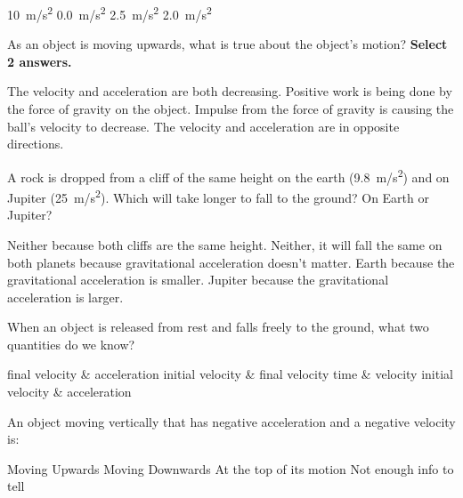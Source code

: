 \documentclass[answers,dvipsnames]{exam}
\begin{document}
\begin{questions}
\begin{randomizechoices}[norandomize]
    \choice \SI{10}{m/s^2}
    \choice \SI{0.0}{m/s^2}
    \correctchoice \SI{2.5}{m/s^2}
    \choice \SI{2.0}{m/s^2}
\end{randomizechoices}

\question
As an object is moving upwards, what is true about the object’s motion? \textbf{Select 2 answers.}


\begin{randomizechoices}[norandomize]
    \choice The velocity and acceleration are both decreasing.
    \choice Positive work is being done by the force of gravity on the object.
    \correctchoice Impulse from the force of gravity is causing the ball’s velocity to decrease.
    \correctchoice The velocity and acceleration are in opposite directions.
\end{randomizechoices}

\question
A rock is dropped from a cliff of the same height on the earth (\SI{9.8}{m/s^2}) and on Jupiter (\SI{25}{m/s^2}). Which will take longer to fall to the ground? On Earth or Jupiter?

\begin{randomizechoices}[norandomize]
    \choice Neither because both cliffs are the same height.
    \choice Neither, it will fall the same on both planets because gravitational acceleration doesn’t matter.
    \correctchoice Earth because the gravitational acceleration is smaller.
    \choice Jupiter because the gravitational acceleration is larger. 
\end{randomizechoices}

\question
When an object is released from rest and falls freely to the ground, what two quantities do we know?

\begin{randomizechoices}[norandomize]
    \choice final velocity \& acceleration
    \choice initial velocity \& final velocity
    \choice time \& velocity
    \correctchoice initial velocity \& acceleration
\end{randomizechoices}

\question 
An object moving vertically that has negative acceleration and a negative velocity is:

\begin{randomizechoices}[norandomize]
    \choice Moving Upwards
    \correctchoice Moving Downwards
    \choice At the top of its motion
    \choice Not enough info to tell
\end{randomizechoices}


\end{questions}
\end{document}
